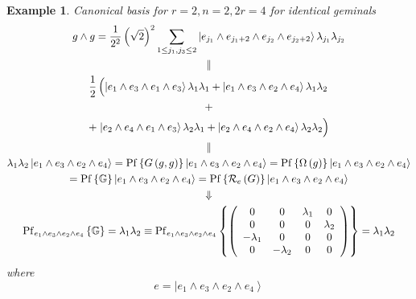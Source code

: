 \documentclass[aps,preprint]{revtex4}%
\newtheorem{example}[theorem]{Example}
\begin{document}
\begin{example}
Canonical basis for $r=2,n=2,2r=4$ for identical geminals
\begin{gather}
g\wedge g=\frac{1}{2^{2}}\left(  \sqrt{2}\right)  ^{2}\sum_{1\leq j_{1}%
,j_{3}\leq2}\left\vert e_{j_{1}}\wedge e_{j_{1}+2}\wedge e_{j_{2}}\wedge
e_{j_{2}+2}\right\rangle \lambda_{j_{1}}\lambda_{j_{2}}\\
\parallel\\
\frac{1}{2}\left(  \overset{}{\left\vert e_{1}\wedge e_{3}\wedge e_{1}\wedge
e_{3}\right\rangle \lambda_{1}\lambda_{1}+\left\vert e_{1}\wedge e_{3}\wedge
e_{2}\wedge e_{4}\right\rangle \lambda_{1}\lambda_{2}}\right. \\
+\\
+\left.  \overset{}{\left\vert e_{2}\wedge e_{4}\wedge e_{1}\wedge
e_{3}\right\rangle \lambda_{2}\lambda_{1}+\left\vert e_{2}\wedge e_{4}\wedge
e_{2}\wedge e_{4}\right\rangle \lambda_{2}\lambda_{2}}\right) \\
\parallel\\
\lambda_{1}\lambda_{2}\left\vert e_{1}\wedge e_{3}\wedge e_{2}\wedge
e_{4}\right\rangle =\operatorname{Pf}\left\{  G\left(  g,g\right)  \right\}
\left\vert e_{1}\wedge e_{3}\wedge e_{2}\wedge e_{4}\right\rangle
=\operatorname{Pf}\left\{  \Omega\left(  g\right)  \right\}  \left\vert
e_{1}\wedge e_{3}\wedge e_{2}\wedge e_{4}\right\rangle \\
=\operatorname{Pf}\left\{  \mathbb{G}\right\}  \left\vert e_{1}\wedge
e_{3}\wedge e_{2}\wedge e_{4}\right\rangle =\operatorname{Pf}\left\{
\mathcal{R}_{e}\left(  G\right)  \right\}  \left\vert e_{1}\wedge e_{3}\wedge
e_{2}\wedge e_{4}\right\rangle \\
\Downarrow\\
\operatorname{Pf}_{e_{1}\wedge e_{3}\wedge e_{2}\wedge e_{4}}\left\{
\mathbb{G}\right\}  =\lambda_{1}\lambda_{2}\equiv\operatorname{Pf}%
_{e_{1}\wedge e_{3}\wedge e_{2}\wedge e_{4}}\left\{  \left(
\begin{array}
[c]{cccc}%
0 & 0 & \lambda_{1} & 0\\
0 & 0 & 0 & \lambda_{2}\\
-\lambda_{1} & 0 & 0 & 0\\
0 & -\lambda_{2} & 0 & 0
\end{array}
\right)  \right\}  =\lambda_{1}\lambda_{2}%
\end{gather}
where%
\begin{equation}
e=\left\vert e_{1}\wedge e_{3}\wedge e_{2}\wedge e_{4}\right\rangle
\end{equation}

\end{example}
\end{document}
